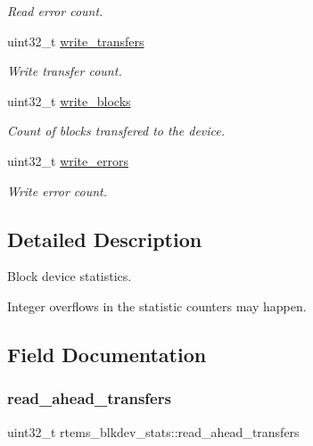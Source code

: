\begin{DoxyCompactItemize}
\begin{DoxyCompactList}\small\item\em Read error count. \end{DoxyCompactList}\item 
uint32\+\_\+t \mbox{\hyperlink{structrtems__blkdev__stats_adea23113b39172399f630b5a52c1b054}{write\+\_\+transfers}}
\begin{DoxyCompactList}\small\item\em Write transfer count. \end{DoxyCompactList}\item 
\mbox{\label{structrtems__blkdev__stats_aac3292247afa84ea4f3920cb0ddef030}} 
uint32\+\_\+t \mbox{\hyperlink{structrtems__blkdev__stats_aac3292247afa84ea4f3920cb0ddef030}{write\+\_\+blocks}}
\begin{DoxyCompactList}\small\item\em Count of blocks transfered to the device. \end{DoxyCompactList}\item 
uint32\+\_\+t \mbox{\hyperlink{structrtems__blkdev__stats_a4f17a197977cd525e17e016552c25df2}{write\+\_\+errors}}
\begin{DoxyCompactList}\small\item\em Write error count. \end{DoxyCompactList}\end{DoxyCompactItemize}


\subsection{Detailed Description}
Block device statistics. 

Integer overflows in the statistic counters may happen. 

\subsection{Field Documentation}
\mbox{\label{structrtems__blkdev__stats_a1102468f161fcfff77623d38211073d5}} 
\subsubsection{\texorpdfstring{read\_ahead\_transfers}{read\_ahead\_transfers}}
{\footnotesize\ttfamily uint32\+\_\+t rtems\+\_\+blkdev\+\_\+stats\+::read\+\_\+ahead\+\_\+transfers}



